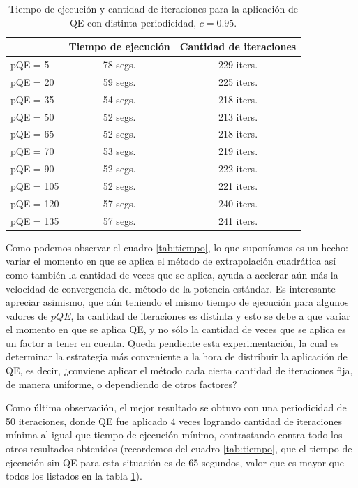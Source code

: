 \begin{table}
\centering
\begin{tabular}{ l | c | c}
  & Tiempo de ejecución & Cantidad de iteraciones\\
  \hline
  pQE = 5 & 78 segs. & 229 iters.\\
  \hline
  pQE = 20 & 59 segs. & 225 iters.\\
  \hline
  pQE = 35 & 54 segs. & 218 iters. \\
  \hline
  pQE = 50 & 52 segs. & 213 iters. \\
  \hline
  pQE = 65 & 52 segs. & 218 iters. \\
  \hline
  pQE = 70 & 53 segs. & 219 iters. \\
  \hline
  pQE = 90 & 52 segs. & 222 iters. \\
  \hline
  pQE = 105 & 52 segs. & 221 iters. \\
  \hline
  pQE = 120 & 57 segs. & 240 iters. \\
  \hline
  pQE = 135 & 57 segs. & 241 iters. \\
  \hline
\end{tabular}
\caption{Tiempo de ejecución y cantidad de iteraciones para la aplicación de QE con distinta periodicidad, $c = 0.95$.}
\label{tab:pQE}
\end{table}
Como podemos observar el cuadro \ref{tab:tiempo}, lo que suponíamos es un hecho: variar el momento en que se aplica el método de extrapolación cuadrática así como también la cantidad de veces que se aplica, ayuda a acelerar aún más la velocidad de convergencia del método de la potencia estándar. Es interesante apreciar asimismo, que aún teniendo el mismo tiempo de ejecución para algunos valores de $pQE$, la cantidad de iteraciones es distinta y esto se debe a que variar el momento en que se aplica QE, y no sólo la cantidad de veces que se aplica es un factor a tener en cuenta. Queda pendiente esta experimentación, la cual es determinar la estrategia más conveniente a la hora de distribuir la aplicación de QE, es decir, ¿conviene aplicar el método cada cierta cantidad de iteraciones fija, de manera uniforme, o dependiendo de otros factores?

Como última observación, el mejor resultado se obtuvo con una periodicidad de 50 iteraciones, donde QE fue aplicado 4 veces logrando cantidad de iteraciones mínima al igual que tiempo de ejecución mínimo, contrastando contra todo los otros resultados obtenidos (recordemos del cuadro \ref{tab:tiempo}, que el tiempo de ejecución sin QE para esta situación es de 65 segundos, valor que es mayor que todos los listados en la tabla \ref{tab:pQE}).

